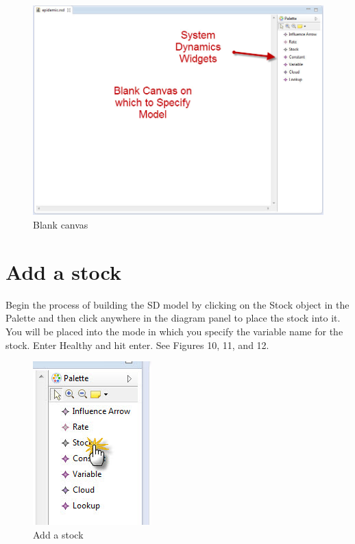 \documentclass[11pt]{amsart}
\begin{document}
\begin{figure}[ht]
\begin{center}
\vspace{.2in}
\centerline {
\includegraphics[totalheight=0.5\textheight]{images/009.jpg}
}
\caption{Blank canvas}
\label{fig:009}
\end{center}
\end{figure}

\section{Add a stock}
Begin the process of building the SD model by clicking on the Stock object in the Palette and then click anywhere in the diagram panel to place the stock into it. You will be placed into the mode in which you specify the variable name for the stock. Enter Healthy and hit enter. See Figures 10, 11, and 12.



\begin{figure}[ht]
\begin{center}
\vspace{.2in}
\centerline {
\includegraphics{images/010.jpg}
}
\caption{Add a stock}
\label{fig:010}
\end{center}
\end{figure}
\end{document}
